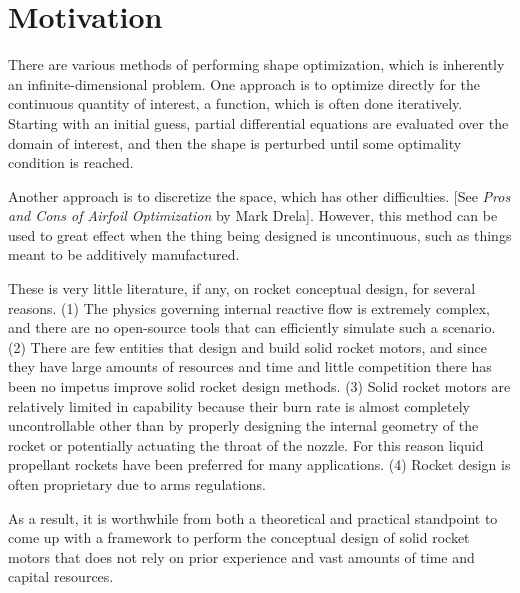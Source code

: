 \section{Motivation}
\label{sec:motivation}
	
There are various methods of performing shape optimization, which is inherently an infinite-dimensional problem.
One approach is to optimize directly for the continuous quantity of interest, a function, which is often done iteratively.
Starting with an initial guess, partial differential equations are evaluated over the domain of interest,
and then the shape is perturbed until some optimality condition is reached.

Another approach is to discretize the space, which has other difficulties.
[See \textit{Pros and Cons of Airfoil Optimization} by Mark Drela].
However, this method can be used to great effect when the thing being designed is
uncontinuous, such as things meant to be additively manufactured.

These is very little literature, if any, on rocket conceptual design,
for several reasons. (1) The physics governing internal reactive flow is extremely complex,
and there are no open-source tools that can efficiently simulate such a scenario.
(2) There are few entities that design and build solid rocket motors, and since they have
large amounts of resources and time and little competition there has been no impetus
improve solid rocket design methods. (3) Solid rocket motors are relatively limited
in capability because their burn rate is almost completely uncontrollable other
than by properly designing the internal geometry of the rocket or potentially actuating the
throat of the nozzle. For this reason liquid propellant rockets have been preferred for
many applications. (4) Rocket design is often proprietary due to arms regulations.

As a result, it is worthwhile from both a theoretical and practical standpoint
to come up with a framework to perform the conceptual design of solid rocket
motors that does not rely on prior experience and vast amounts of time and capital resources.
